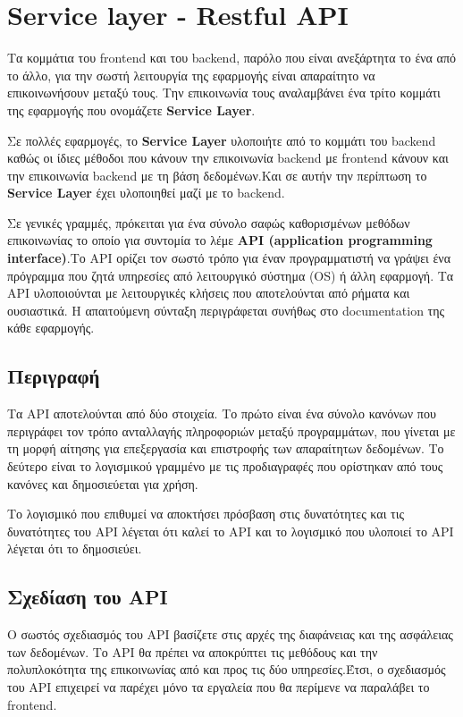 \thispagestyle{empty}

\chapter{Service layer - Restful API}

\par
Τα κομμάτια του frontend και του backend, παρόλο που είναι ανεξάρτητα το ένα από το άλλο, για την σωστή λειτουργία της εφαρμογής είναι απαραίτητο να επικοινωνήσουν μεταξύ τους. Την επικοινωνία τους αναλαμβάνει ένα τρίτο κομμάτι της εφαρμογής που ονομάζετε \textbf{Service Layer}.\par Σε πολλές εφαρμογές, το \textbf{Service Layer} υλοποιήτε από το κομμάτι του backend καθώς οι ίδιες μέθοδοι που κάνουν την επικοινωνία backend με frontend κάνουν και την επικοινωνία backend με τη βάση δεδομένων.Και σε αυτήν την περίπτωση το \textbf{Service Layer} έχει υλοποιηθεί μαζί με το backend.\par Σε γενικές γραμμές, πρόκειται για ένα σύνολο σαφώς καθορισμένων μεθόδων επικοινωνίας το οποίο για συντομία το λέμε \textbf{API (application programming interface)}.Το API ορίζει τον σωστό τρόπο για έναν προγραμματιστή να γράψει ένα πρόγραμμα που ζητά υπηρεσίες από λειτουργικό σύστημα (OS) ή άλλη εφαρμογή. Τα API υλοποιούνται με λειτουργικές κλήσεις που αποτελούνται από ρήματα και ουσιαστικά. Η απαιτούμενη σύνταξη περιγράφεται συνήθως στο documentation της κάθε εφαρμογής.


\vspace{60mm}

\section{Περιγραφή}
	Τα API αποτελούνται από δύο στοιχεία. Το πρώτο είναι ένα σύνολο κανόνων που περιγράφει τον τρόπο ανταλλαγής πληροφοριών μεταξύ προγραμμάτων, που γίνεται με τη μορφή αίτησης για επεξεργασία και επιστροφής των απαραίτητων δεδομένων. Το δεύτερο είναι το λογισμικού γραμμένο με τις προδιαγραφές που ορίστηκαν από τους κανόνες και δημοσιεύεται για χρήση.

Το λογισμικό που επιθυμεί να αποκτήσει πρόσβαση στις δυνατότητες και τις δυνατότητες του API λέγεται ότι καλεί το API και το λογισμικό που υλοποιεί το API λέγεται ότι το δημοσιεύει.

\section{Σχεδίαση του API}
	Ο σωστός σχεδιασμός του API βασίζετε στις αρχές της διαφάνειας και της ασφάλειας των δεδομένων. Το API θα πρέπει να αποκρύπτει τις μεθόδους και την πολυπλοκότητα της επικοινωνίας από και προς τις δύο υπηρεσίες.Έτσι, ο σχεδιασμός του API επιχειρεί να παρέχει μόνο τα εργαλεία που θα περίμενε να παραλάβει το frontend.
\newline

